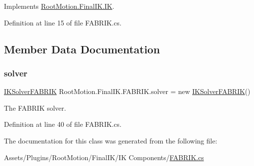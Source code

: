 Implements \mbox{\hyperlink{class_root_motion_1_1_final_i_k_1_1_i_k_a1922e31d550e27dcc60eca0d62c699c5}{Root\+Motion.\+Final\+I\+K.\+IK}}.



Definition at line 15 of file F\+A\+B\+R\+I\+K.\+cs.



\subsection{Member Data Documentation}
\mbox{\label{class_root_motion_1_1_final_i_k_1_1_f_a_b_r_i_k_a190159670a8a9580a984a3f4d7e888f2}} 
\subsubsection{\texorpdfstring{solver}{solver}}
{\footnotesize\ttfamily \mbox{\hyperlink{class_root_motion_1_1_final_i_k_1_1_i_k_solver_f_a_b_r_i_k}{I\+K\+Solver\+F\+A\+B\+R\+IK}} Root\+Motion.\+Final\+I\+K.\+F\+A\+B\+R\+I\+K.\+solver = new \mbox{\hyperlink{class_root_motion_1_1_final_i_k_1_1_i_k_solver_f_a_b_r_i_k}{I\+K\+Solver\+F\+A\+B\+R\+IK}}()}



The F\+A\+B\+R\+IK solver. 



Definition at line 40 of file F\+A\+B\+R\+I\+K.\+cs.



The documentation for this class was generated from the following file\+:\begin{DoxyCompactItemize}
\item 
Assets/\+Plugins/\+Root\+Motion/\+Final\+I\+K/\+I\+K Components/\mbox{\hyperlink{_f_a_b_r_i_k_8cs}{F\+A\+B\+R\+I\+K.\+cs}}\end{DoxyCompactItemize}

